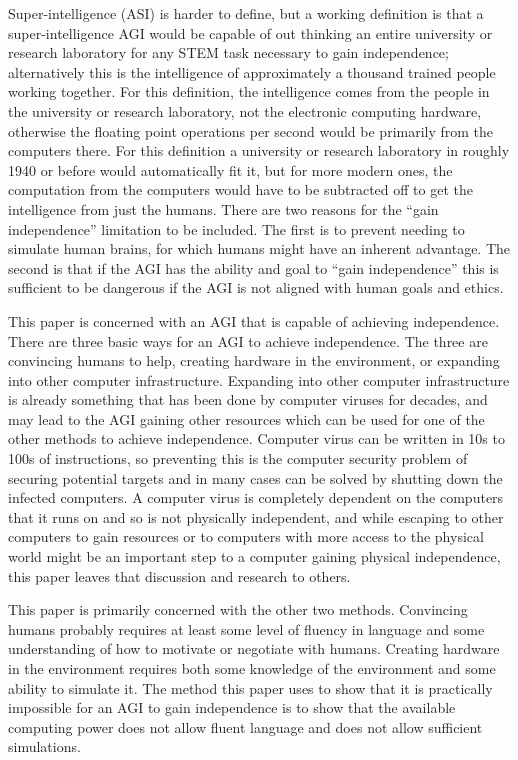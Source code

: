 \documentclass[letterpaper,twocolumn]{article}
\begin{document}
Super-intelligence (ASI) is harder to define, but a
working definition is that a super-intelligence AGI would be capable
of out thinking an entire university or research laboratory for any
STEM task necessary to gain independence; alternatively this is the
intelligence of approximately a thousand trained people working
together. For this definition, the intelligence comes from
the people in the university or research laboratory, not the
electronic computing hardware, otherwise the floating point operations
per second would be primarily from the computers there. For this
definition a university or research laboratory in roughly 1940 or
before would automatically fit it, but for more modern ones, the
computation from the computers would have to be subtracted off to get
the intelligence from just the humans. There are two reasons for the ``gain
independence'' limitation to be included. The first is to prevent needing to
simulate human brains, for which humans might have an inherent
advantage. The second is that if the AGI has the ability and goal to ``gain
independence'' this is sufficient to be dangerous if the AGI is not
aligned with human goals and ethics.

This paper is concerned with an AGI that is capable of achieving
independence. There are three basic ways for an AGI to
achieve independence. The three are convincing humans to help,
creating hardware in the environment, or expanding into other computer
infrastructure. Expanding into other computer infrastructure is
already something that has been done by computer viruses for decades,
and may lead to the AGI gaining other resources which can be used for
one of the other methods to achieve independence. Computer virus can
be written in 10s to 100s of instructions, so preventing this is the
computer security problem of securing potential targets and in many
cases can be solved by shutting down the infected computers. A
computer virus is completely dependent on the computers that it runs
on and so is not physically independent, and while escaping to other
computers to gain resources or to computers with more access to the
physical world might be an important step to a computer gaining
physical independence, this paper leaves that discussion and research
to others.

This paper is primarily concerned with the other two methods.
Convincing humans probably requires at least some level of fluency in
language and some understanding of how to motivate or negotiate with
humans. Creating hardware in the environment requires both some
knowledge of the environment and some ability to simulate it.  The
method this paper uses to show that it is practically impossible for
an AGI to gain independence is to show that the available computing
power does not allow fluent language and does not allow sufficient
simulations.
\end{document}
